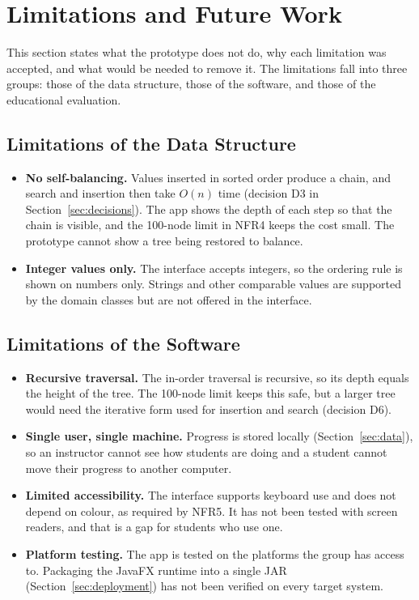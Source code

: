 \section{Limitations and Future Work}\label{sec:limitations}

This section states what the prototype does not do, why each limitation was accepted, and what would be needed to remove it. The limitations fall into three groups: those of the data structure, those of the software, and those of the educational evaluation.

\subsection{Limitations of the Data Structure}
\begin{itemize}
    \item \textbf{No self-balancing.} Values inserted in sorted order produce a chain, and search and insertion then take $O(n)$ time (decision D3 in Section~\ref{sec:decisions}). The app shows the depth of each step so that the chain is visible, and the 100-node limit in NFR4 keeps the cost small. The prototype cannot show a tree being restored to balance.
    \item \textbf{Integer values only.} The interface accepts integers, so the ordering rule is shown on numbers only. Strings and other comparable values are supported by the domain classes but are not offered in the interface.
\end{itemize}

\subsection{Limitations of the Software}
\begin{itemize}
    \item \textbf{Recursive traversal.} The in-order traversal is recursive, so its depth equals the height of the tree. The 100-node limit keeps this safe, but a larger tree would need the iterative form used for insertion and search (decision D6).
    \item \textbf{Single user, single machine.} Progress is stored locally (Section~\ref{sec:data}), so an instructor cannot see how students are doing and a student cannot move their progress to another computer.
    \item \textbf{Limited accessibility.} The interface supports keyboard use and does not depend on colour, as required by NFR5. It has not been tested with screen readers, and that is a gap for students who use one.
    \item \textbf{Platform testing.} The app is tested on the platforms the group has access to. Packaging the JavaFX runtime into a single JAR (Section~\ref{sec:deployment}) has not been verified on every target system.
\end{itemize}


